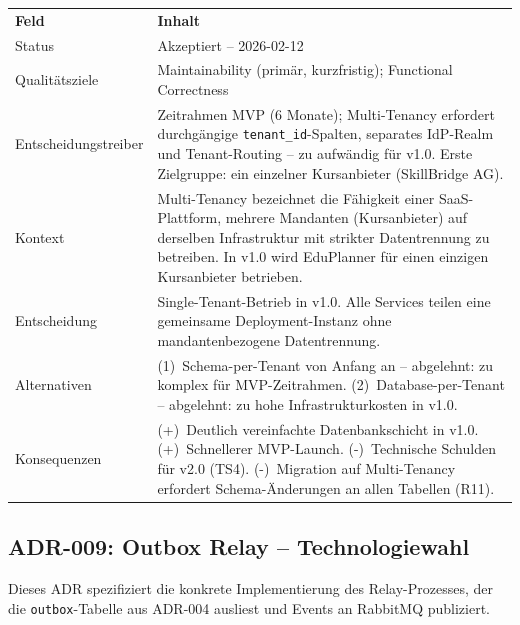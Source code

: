 \begin{tabularx}{\textwidth}{L{3.5cm} X}
  \color{white}\textbf{Feld} & \color{white}\textbf{Inhalt} \\
  Status & Akzeptiert -- 2026-02-12 \\
  Qualitätsziele & Maintainability (primär, kurzfristig); Functional Correctness \\
  Entscheidungstreiber & Zeitrahmen MVP (6 Monate); Multi-Tenancy erfordert durchgängige \texttt{tenant\_id}-Spalten, separates IdP-Realm und Tenant-Routing -- zu aufwändig für v1.0. Erste Zielgruppe: ein einzelner Kursanbieter (SkillBridge AG). \\
  Kontext & Multi-Tenancy bezeichnet die Fähigkeit einer SaaS-Plattform, mehrere Mandanten (Kursanbieter) auf derselben Infrastruktur mit strikter Datentrennung zu betreiben. In v1.0 wird EduPlanner für einen einzigen Kursanbieter betrieben. \\
  Entscheidung & Single-Tenant-Betrieb in v1.0. Alle Services teilen eine gemeinsame Deployment-Instanz ohne mandantenbezogene Datentrennung. \\
  Alternativen & (1)~Schema-per-Tenant von Anfang an -- abgelehnt: zu komplex für MVP-Zeitrahmen. (2)~Database-per-Tenant -- abgelehnt: zu hohe Infrastrukturkosten in v1.0. \\
  Konsequenzen & (+)~Deutlich vereinfachte Datenbankschicht in v1.0. (+)~Schnellerer MVP-Launch. (-)~Technische Schulden für v2.0 (TS4). (-)~Migration auf Multi-Tenancy erfordert Schema-Änderungen an allen Tabellen (R11). \\
\end{tabularx}

\subsection{ADR-009: Outbox Relay -- Technologiewahl}

Dieses ADR spezifiziert die konkrete Implementierung des Relay-Prozesses, der die
\texttt{outbox}-Tabelle aus ADR-004 ausliest und Events an RabbitMQ publiziert.

